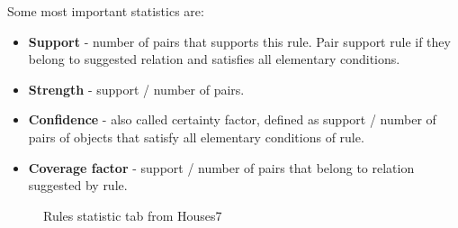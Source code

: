 Some most important statistics are:
\begin{itemize}
	\item \textbf{Support} - number of pairs that supports this rule. Pair support rule if they belong to suggested relation and satisfies all elementary conditions.
	\item \textbf{Strength} - support / number of pairs.
	\item \textbf{Confidence} - also called certainty factor, defined as support / number of pairs of objects that satisfy all elementary conditions of rule.
	\item \textbf{Coverage factor} - support / number of pairs that belong to relation suggested by rule.
\end{itemize}

\begin{figure*}[!ht] 
	\centering
	\caption{Rules statistic tab from Houses7}
\end{figure*}

\vfill\newpage